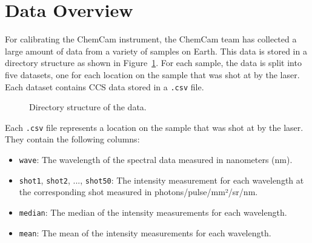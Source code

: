 \section{Data Overview}\label{sec:data_overview}
For calibrating the ChemCam instrument, the ChemCam team has collected a large amount of data from a variety of samples on Earth\cite{wiensPreFlight3}.
This data is stored in a directory structure as shown in Figure~\ref{fig:directory_structure}.
For each sample, the data is split into five datasets, one for each location on the sample that was shot at by the laser.
Each dataset contains CCS data stored in a \texttt{.csv} file.

\begin{figure}[ht]
\caption{Directory structure of the data.}
\label{fig:directory_structure}
\end{figure}

Each \texttt{.csv} file represents a location on the sample that was shot at by the laser.
They contain the following columns:

\begin{itemize}
    \item \texttt{wave}: The wavelength of the spectral data measured in nanometers (nm).
    \item \texttt{shot1}, \texttt{shot2}, ..., \texttt{shot50}: The intensity measurement for each wavelength at the corresponding shot measured in photons/pulse/mm²/sr/nm.
    \item \texttt{median}: The median of the intensity measurements for each wavelength.
    \item \texttt{mean}: The mean of the intensity measurements for each wavelength.
\end{itemize}

